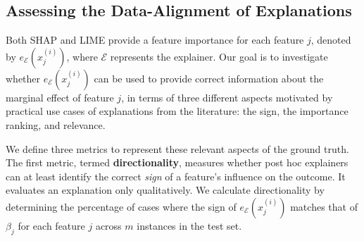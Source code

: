 \documentclass[12pt]{article}  %
\newcommand{\mE}{\mathcal{E}}
\begin{document}
\vspace{-2mm}\subsection{Assessing the Data-Alignment of Explanations}
  \label{sec:evaluating_faithfulness}\vspace{-2mm}
  Both SHAP and LIME provide a feature importance for each feature $j$, denoted by $e_\mE(x^{(i)}_j)$, where $\mE$ represents the explainer. 
   Our goal is to investigate whether $e_\mE(x^{(i)}_j)$ can be used to provide correct information about the marginal effect of feature $j$, in terms of three different aspects motivated by practical use cases of explanations from the literature: the sign, the importance ranking, and relevance. 

We define three metrics to represent these relevant aspects of the ground truth.
  The first metric, termed \textbf{directionality}, measures whether post hoc explainers can at least identify the correct \textit{sign} of a feature's influence on the outcome. It evaluates an explanation only qualitatively. We calculate directionality by determining the percentage of cases where the sign of $e_\mE(x^{(i)}_j)$ matches that of $\beta_j$ for each feature $j$ across $m$ instances in the test set. 
\end{document}
